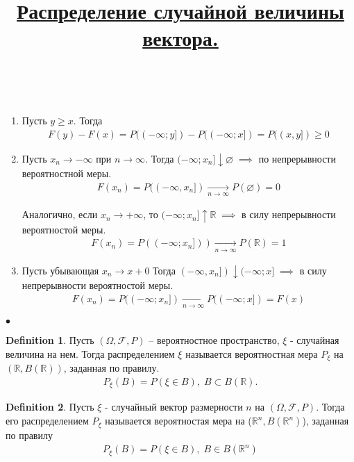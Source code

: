 \documentclass[a4paper]{article}
\theoremstyle{plain}
\theoremstyle{remark}
\theoremstyle{definition}
\newtheorem{definition}{Definition}
\renewenvironment{proof}{{\bfseries Proof}}{$\bullet$}
\newcommand{\setR}{\mathbb{R}}
\newcommand{\setRn}{\mathbb{R}^n}
\newcommand{\setF}{\mathcal{F}}
\newcommand{\todown}[1]{\xrightarrow[#1]{}}
\renewcommand{\emptyset}{\varnothing}
\renewcommand{\geq}{\geqslant}
\newcommand{\bigtitle}[1]{\title{\textbf{\underline{#1}}}}
\begin{document}
\begin{proof}~

	\begin{enumerate}
		\item 
			Пусть $y \geq x$. Тогда
			\begin{align*}
				F(y) - F(x) = P((-\infty; y]) - P((-\infty; x]) = P((x, y]) \geq 0
			\end{align*}

		\item 
			Пусть $x_n \rightarrow -\infty$ при $n \rightarrow \infty$. 
			Тогда $(-\infty; x_n] \downarrow \emptyset\; \implies$ по непрерывности вероятностной меры.
			\begin{align*}
				F(x_n) = P((-\infty, x_n]) \todown{n \to \infty} P(\emptyset) = 0
			\end{align*}

			Аналогично, если $x_n \to +\infty$, то $(-\infty; x_n] \uparrow \setR\; \implies$ 
			в силу непрерывности вероятностой меры.
			\begin{align*}
				F(x_n) = P((-\infty; x_n])) \todown{n \to \infty} P(\setR) = 1
			\end{align*}

		\item 
			Пусть убывающая $x_n \to x + 0$ Тогда $(-\infty, x_n]) \downarrow (-\infty; x]\; \implies$ 
			в силу непрерывности вероятностой меры.
			\begin{align*}
				F(x_n) = P((-\infty; x_n]) \todown{n \to \infty} P((-\infty; x]) = F(x)
			\end{align*}
	\end{enumerate}
\end{proof}

\bigtitle{Распределение случайной величины вектора.}

\begin{definition}
  Пусть $(\Omega, \setF, P)$ -- вероятностное пространство, $\xi$ - случайная величина на нем. Тогда распределением $\xi$ называется вероятностная мера $P_\xi$ на $(\setR, B(\setR))$, заданная по правилу.
  \begin{align*}
    P_\xi (B) = P(\xi \in B),\; B \subset B(\setR).
  \end{align*}
\end{definition}

\begin{definition}
  Пусть $\xi$ - случайный вектор размерности $n$ на $(\Omega, \setF, P)$. 
  Тогда его распределением $P_\xi$ называется вероятностая мера на ($\setRn, B(\setRn)$), заданная по правилу
    \begin{align*}
      P_\xi (B) = P(\xi \in B),\; B \in B(\setRn)
    \end{align*}
\end{definition}
\end{document}
